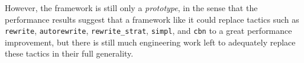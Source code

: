 \documentclass[twoside]{article}
\begin{document}
However, the framework is still only a \emph{prototype}, in the sense that the performance results suggest that a framework like it could replace tactics such as \texttt{rewrite}, \texttt{autorewrite}, \texttt{rewrite\_strat}, \texttt{simpl}, and \texttt{cbn} to a great performance improvement, but there is still much engineering work left to adequately replace these tactics in their full generality.



\end{document}
